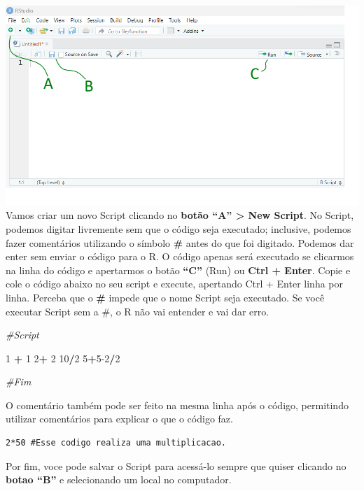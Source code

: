 \documentclass[
]{book}
\newenvironment{Shaded}{\begin{snugshade}}{\end{snugshade}}
\newcommand{\CommentTok}[1]{\textcolor[rgb]{0.56,0.35,0.01}{\textit{#1}}}
\newcommand{\DecValTok}[1]{\textcolor[rgb]{0.00,0.00,0.81}{#1}}
\newcommand{\SpecialCharTok}[1]{\textcolor[rgb]{0.81,0.36,0.00}{\textbf{#1}}}
\begin{document}
\includegraphics{img/Figura3_script.png}
Vamos criar um novo Script clicando no \textbf{botão ``A'' \textgreater{} New Script}. No Script, podemos digitar livremente sem que o código seja executado; inclusive, podemos fazer comentários utilizando o símbolo \textbf{\#} antes do que foi digitado. Podemos dar enter sem enviar o código para o R. O código apenas será executado se clicarmos na linha do código e apertarmos o botão \textbf{``C''} (Run) ou \textbf{Ctrl + Enter}. Copie e cole o código abaixo no seu script e execute, apertando Ctrl + Enter linha por linha. Perceba que o \textbf{\#} impede que o nome Script seja executado. Se você executar Script sem a \#, o R não vai entender e vai dar erro.

\begin{Shaded}
\begin{Highlighting}[]
\CommentTok{\#Script }

\DecValTok{1} \SpecialCharTok{+} \DecValTok{1}
\DecValTok{2}\SpecialCharTok{+} \DecValTok{2}
\DecValTok{10}\SpecialCharTok{/}\DecValTok{2}
\DecValTok{5}\SpecialCharTok{+}\DecValTok{5{-}2}\SpecialCharTok{/}\DecValTok{2}

\CommentTok{\#Fim}
\end{Highlighting}
\end{Shaded}

O comentário também pode ser feito na mesma linha após o código, permitindo utilizar comentários para explicar o que o código faz.

\begin{verbatim}
2*50 #Esse codigo realiza uma multiplicacao.
\end{verbatim}

Por fim, voce pode salvar o Script para acessá-lo sempre que quiser clicando no \textbf{botao ``B''} e selecionando um local no computador.
\end{document}
